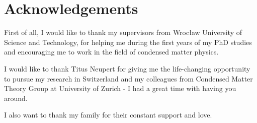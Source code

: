 
\bigskip

\begingroup
\let\clearpage\relax
\let\cleardoublepage\relax
\let\cleardoublepage\relax
\chapter*{Acknowledgements}

\def\thanks#1{%
\begingroup
\leftskip1em
\noindent #1
\par
\endgroup
}

First of all, I would like to thank my supervisors from Wrocław University of Science and Technology, for helping me during the first years of my PhD studies and encouraging me to work in the field of condensed matter physics.

I would like to thank Titus Neupert for giving me the life-changing opportunity to pursue my research in Switzerland and my colleagues from Condensed Matter Theory Group at University of Zurich - I had a great time with having you around.

I also want to thank my family for their constant support and love.

\endgroup
